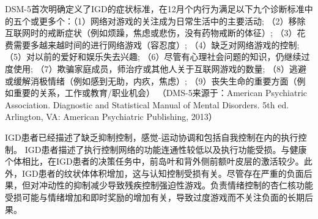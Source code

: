 DSM-5首次明确定义了IGD的症状标准，在12月个内行为满足以下九个诊断标准中的五个或更多个：（1）网络对游戏的关注成为日常生活中的主要活动; （2）移除互联网时的戒断症状（例如烦躁，焦虑或悲伤，没有药物戒断的体征）; （3）花费需要多越来越时间的进行网络游戏（容忍度）; （4）缺乏对网络游戏的控制; （5）对以前的爱好和娱乐失去兴趣; （6）尽管有心理社会问题的知识，仍继续过度使用; （7）欺骗家庭成员，师治疗或其他人关于互联网游戏的数量; （8）逃避或缓解消极情绪（例如感到无助，内疚，焦虑）; （9）丧失生命的重要方面（例如重要的关系，工作或教育/职业机会）
（DMS-5来源于：American Psychiatric Association. Diagnostic and Statistical Manual of Mental Disorders. 5th ed. Arlington, VA: American Psychiatric Publishing, 2013）



IGD患者已经描述了缺乏抑制控制，感觉-运动协调和包括自我控制在内的执行控制。 IGD患者描述了执行控制网络的功能连通性较低以及执行功能受损。与健康个体相比，在IGD患者的决策任务中，前岛叶和背外侧前额叶皮层的激活较少。此外，IGD患者的纹状体体积增加，这与认知控制受损有关。尽管存在严重的负面后果，但对冲动性的抑制减少导致残疾控制强迫性游戏。负责情绪控制的杏仁核功能受损可能与情绪增加和即时奖励的增加有关，导致过度游戏而不关注负面的长期后果。

